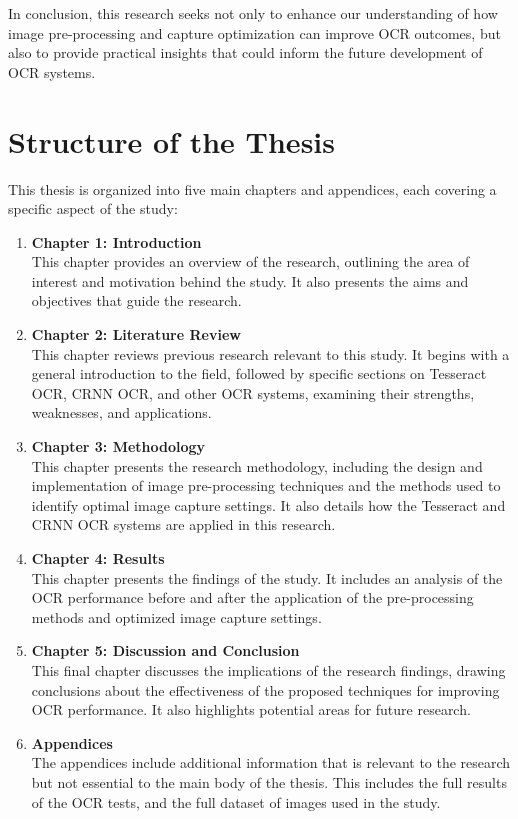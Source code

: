 In conclusion, this research seeks not only to enhance our understanding of how image pre-processing and capture optimization can improve OCR outcomes, but also to provide practical insights that could inform the future development of OCR systems.

\newpage

\section{Structure of the Thesis}

This thesis is organized into five main chapters and appendices, each covering a specific aspect of the study:

\begin{enumerate}
    \item \textbf{Chapter 1: Introduction}\\
          This chapter provides an overview of the research, outlining the area of interest and motivation behind the study. It also presents the aims and objectives that guide the research.

    \item \textbf{Chapter 2: Literature Review}\\
          This chapter reviews previous research relevant to this study. It begins with a general introduction to the field, followed by specific sections on Tesseract OCR, CRNN OCR, and other OCR systems, examining their strengths, weaknesses, and applications.

    \item \textbf{Chapter 3: Methodology}\\
          This chapter presents the research methodology, including the design and implementation of image pre-processing techniques and the methods used to identify optimal image capture settings. It also details how the Tesseract and CRNN OCR systems are applied in this research.

    \item \textbf{Chapter 4: Results}\\
          This chapter presents the findings of the study. It includes an analysis of the OCR performance before and after the application of the pre-processing methods and optimized image capture settings.

    \item \textbf{Chapter 5: Discussion and Conclusion}\\
          This final chapter discusses the implications of the research findings, drawing conclusions about the effectiveness of the proposed techniques for improving OCR performance. It also highlights potential areas for future research.

    \item \textbf{Appendices}\\
          The appendices include additional information that is relevant to the research but not essential to the main body of the thesis. This includes the full results of the OCR tests, and the full dataset of images used in the study.
\end{enumerate}


